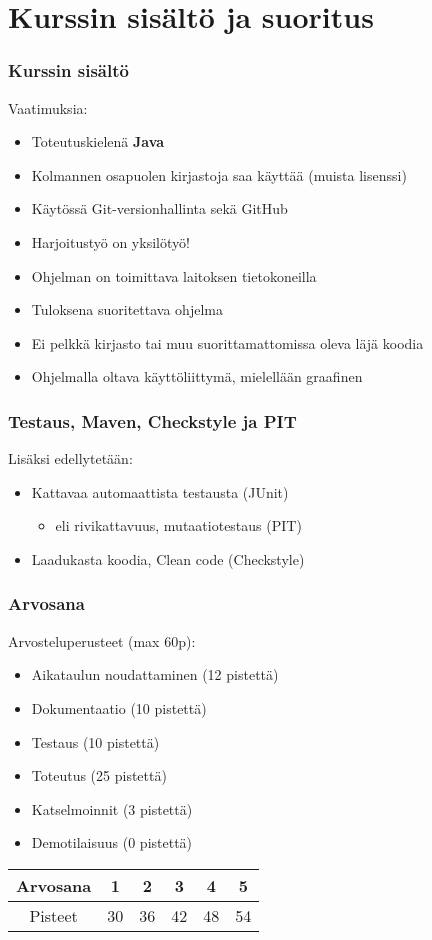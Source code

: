 \documentclass[finnish]{beamer}
\begin{document}
	\section{Kurssin sisältö ja suoritus}
	
	\begin{frame}
		\frametitle{Kurssin sisältö}

		Vaatimuksia:
		\begin{itemize}
			\item Toteutuskielenä \textbf{Java}
			\item Kolmannen osapuolen kirjastoja saa käyttää (muista lisenssi)
			\item Käytössä Git-versionhallinta sekä GitHub
			\item Harjoitustyö on yksilötyö!
			\item Ohjelman on toimittava laitoksen tietokoneilla
			\item Tuloksena suoritettava ohjelma
			\item Ei pelkkä kirjasto tai muu suorittamattomissa oleva läjä koodia
			\item Ohjelmalla oltava käyttöliittymä, mielellään graafinen
		\end{itemize}
	\end{frame}

	\begin{frame}
		\frametitle{Testaus, Maven, Checkstyle ja PIT}
		
		Lisäksi edellytetään:
		\begin{itemize}
			\item Kattavaa automaattista testausta (JUnit)
			\begin{itemize}
				\item eli rivikattavuus, mutaatiotestaus (PIT)
			\end{itemize}
			\item Laadukasta koodia, Clean code (Checkstyle)
		\end{itemize}

		
	\end{frame}
	
	\begin{frame}
		\frametitle{Arvosana}
		
		Arvosteluperusteet (max 60p):
		\begin{itemize}
			\item Aikataulun noudattaminen (12 pistettä)
			\item Dokumentaatio (10 pistettä)
			\item Testaus (10 pistettä)
			\item Toteutus (25 pistettä)
			\item Katselmoinnit (3 pistettä)
			\item Demotilaisuus (0 pistettä)
		\end{itemize}
		
		\begin{tabular}{|c|c|c|c|c|c|}
			\hline Arvosana & 1 & 2 & 3 & 4 & 5 \\ 
			\hline Pisteet & 30 & 36 & 42 & 48 & 54 \\ 
			\hline 
		\end{tabular} 
	\end{frame}
	
\end{document}
